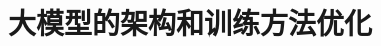 \setcounter{chapter}{19}

\hypertarget{ux5927ux6a21ux578bux7684ux67b6ux6784ux548cux8badux7ec3ux65b9ux6cd5ux4f18ux5316}{%
\chapter{大模型的架构和训练方法优化}\label{ux5927ux6a21ux578bux7684ux67b6ux6784ux548cux8badux7ec3ux65b9ux6cd5ux4f18ux5316}}
